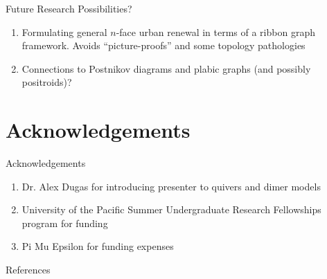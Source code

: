 \begin{frame}{Future Research Possibilities?}
\begin{enumerate}
\begin{center}
        \end{center}

        \vfill
        
        \item Formulating general $n$-face urban renewal in terms of a ribbon graph framework. Avoids ``picture-proofs'' and some topology pathologies \cite{bocklandtDimerABC2015}
        
        \vfill
        
        \item Connections to Postnikov diagrams and plabic graphs (and possibly positroids)?
    \end{enumerate}
\end{frame}


\section{Acknowledgements}

\begin{frame}{Acknowledgements}
    \begin{enumerate}
        \item Dr. Alex Dugas for introducing presenter to quivers and dimer models
        
        \vfill

        \item University of the Pacific Summer Undergraduate Research Fellowships program for funding
        
        \vfill

        \item Pi Mu Epsilon for funding expenses
    \end{enumerate}
\end{frame}

\begin{frame}[allowframebreaks]{References}
    \printbibliography
\end{frame}


